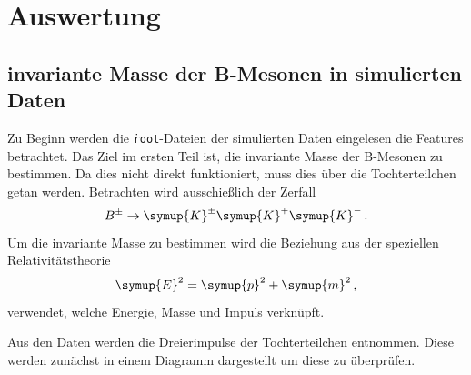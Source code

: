 \section{Auswertung}
\label{sec:auswertung}
\subsection{invariante Masse der B-Mesonen in simulierten Daten}

Zu Beginn werden die \texttt{\.root}-Dateien der simulierten Daten eingelesen die Features betrachtet.
Das Ziel im ersten Teil ist, die invariante Masse der B-Mesonen zu bestimmen. Da dies nicht direkt funktioniert, muss dies \"uber die Tochterteilchen getan werden.
Betrachten wird ausschie\ss lich der Zerfall
\begin{equation}
  B^{\pm} \to \symup{K}^{\pm} \symup{K}^{+} \symup{K}^{-}\,.
\end{equation}
Um die invariante Masse zu bestimmen wird die Beziehung aus der speziellen Relativit\"atstheorie
\begin{equation}
  \symup{E}^2 = \symup{p}^2 + \symup{m}^2\,,
  \label{eqn:relativityEQ}
\end{equation}
verwendet, welche Energie, Masse und Impuls verkn\"upft.

Aus den Daten werden die Dreierimpulse der Tochterteilchen entnommen.
Diese werden zunächst in einem Diagramm dargestellt um diese zu überprüfen.

